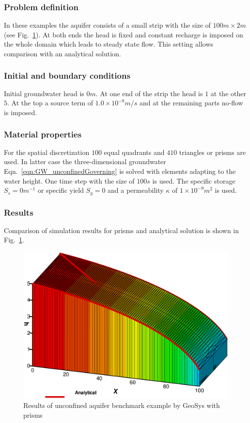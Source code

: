 \subsubsection*{Problem definition}
%
In these examples the aquifer consists of a small strip with the size of $100m \times 2m$ (see Fig.~\ref{GW_Results_uc}). At both ends the head is fixed and constant recharge is imposed on the whole domain which leads to steady state flow. This setting allows comparison with an analytical solution.
%
\subsubsection*{Initial and boundary conditions}
%
Initial groundwater head is $0m$. At one end of the strip the head is $1$ at the other $5$. At the top a source term of $1.0\times 10^{-8} m/s$ and at the remaining parts no-flow is imposed.
\subsubsection*{Material properties}
%
For the spatial discretization $100$ equal quadrants and $410$ triangles or prisms are used. In latter case the three-dimensional groundwater Eqn.~\ref{eqn:GW_unconfinedGoverning} is solved with elements adapting to the water height. One time step with the size of $100 s$ is used. The specific storage $S_s = 0 m^{-1}$ or specific yield $S_y = 0$ and a permeability $\kappa$ of $1\times 10^{-9} m^2$ is used.
%
\subsubsection*{Results}
%
Comparison of simulation results for prisms and analytical solution is shown in Fig.~\ref{GW_Results_uc}.
%
\begin{figure} [htb!]
 \centering
\includegraphics[width=0.7\columnwidth] {H_GW/figures/uc_pris.eps}
\caption{Results of unconfined aquifer benchmark example by GeoSys with prisms}
 \label{GW_Results_uc}
\end{figure}
%
